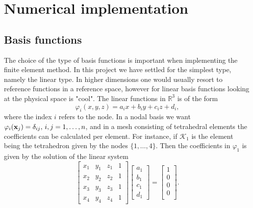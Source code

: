 \section{Numerical implementation}
\subsection{Basis functions}
The choice of the type of basis functions is important when implementing the finite element method. In this project we have settled for the simplest type, namely the linear type. In higher dimensions one would usually resort to reference functions in a reference space, however for linear basis functions looking at the physical space is "cool". The linear functions in $\mathbb{R}^3$ is of the form
\begin{equation}
	\varphi_i(x,y,z) = a_ix + b_iy + c_iz + d_i,
\end{equation}
where the index $i$ refers to the node. In a nodal basis we want $\varphi_i(\vb{x}_j) = \delta_{ij},\, i,j = 1,\dots,n$, and in a mesh consisting of tetrahedral elements the coefficients can be calculated per element. For instance, if $\mathcal{K}_1$ is the element being the tetrahedron given by the nodes $\{1,\dots,4\}$. Then the coefficients in $\varphi_1$ is given by the solution of the linear system
\begin{equation}
%
    \begin{bmatrix}
        x_1 & y_1 & z_1 & 1 \\
        x_2 & y_2 & z_2 & 1 \\
        x_3 & y_3 & z_3 & 1 \\
        x_4 & y_4 & z_4 & 1
     \end{bmatrix}
     \begin{bmatrix}
        a_1 \\
        b_1 \\
        c_1 \\
        d_1 
    \end{bmatrix}
    =
    \begin{bmatrix}
        1 \\
        0 \\
        0 \\
        0 \\
    \end{bmatrix}.
%
\end{equation}

